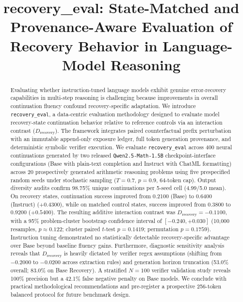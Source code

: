 \documentclass[conference]{IEEEtran}
\begin{document}
\setlength{\textfloatsep}{6pt plus 1pt minus 1pt}
\setlength{\floatsep}{6pt plus 1pt minus 1pt}
\setlength{\intextsep}{6pt plus 1pt minus 1pt}


\title{recovery\_eval: State-Matched and Provenance-Aware Evaluation of Recovery Behavior in Language-Model Reasoning}

\author{
}

\maketitle

\begin{abstract}
Evaluating whether instruction-tuned language models exhibit genuine error-recovery capabilities in multi-step reasoning is challenging because improvements in overall continuation fluency confound recovery-specific adaptation. We introduce \texttt{recovery\_eval}, a data-centric evaluation methodology designed to evaluate model recovery-state continuation behavior relative to reference controls via an interaction contrast ($D_{\text{recovery}}$). The framework integrates paired counterfactual prefix perturbation with an immutable append-only exposure ledger, full token generation provenance, and deterministic symbolic verifier execution. We evaluate \texttt{recovery\_eval} across 400 neural continuations generated by two released \texttt{Qwen2.5-Math-1.5B} checkpoint-interface configurations (Base with plain-text completion and Instruct with ChatML formatting) across 20 prospectively generated arithmetic reasoning problems using five prespecified random seeds under stochastic sampling ($T=0.7$, $p=0.9$, 64-token cap). Output diversity audits confirm 98.75\% unique continuations per 5-seed cell (4.99/5.0 mean). On recovery states, continuation success improved from 0.2100 (Base) to 0.6400 (Instruct) ($+0.4300$), while on matched control states, success improved from 0.3800 to 0.9200 ($+0.5400$). The resulting additive interaction contrast was $D_{\text{recovery}} = -0.1100$, with a 95\% problem-cluster bootstrap confidence interval of $[-0.240, +0.030]$ (10,000 resamples, $p \approx 0.122$; cluster paired $t$-test $p=0.1419$; permutation $p=0.1759$). Instruction tuning demonstrated no statistically detectable recovery-specific advantage over Base beyond baseline fluency gains. Furthermore, diagnostic sensitivity analysis reveals that $D_{\text{recovery}}$ is heavily dictated by verifier regex assumptions (shifting from $-0.2000$ to $-0.0200$ across extraction rules) and generation horizon truncation (53.0\% overall; 83.0\% on Base Recovery). A stratified $N=100$ verifier validation study reveals 100\% precision but a 42.1\% false negative penalty on Base models. We conclude with practical methodological recommendations and pre-register a prospective 256-token balanced protocol for future benchmark design.
\end{abstract}
\end{document}
